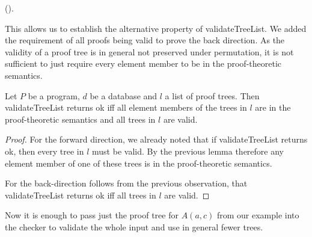(\allTreeElementsOfValidTreeInSemantics).

This allows us to establish the alternative property of validateTreeList. We added the requirement of all proofs being valid to prove the back direction. As the validity of a proof tree is in general not preserved under permutation, it is not sufficient to just require every element member to be in the proof-theoretic semantics.

\begin{lemma}[\validateTreeListUnitIffSubsetSemanticsAndAllValid]
    Let $P$ be a program, $d$ be a database and $l$ a list of proof trees. Then validateTreeList returns ok iff all element members of the trees in $l$ are in the proof-theoretic semantics and all trees in $l$ are valid.
\end{lemma}
\begin{proof}
    For the forward direction, we already noted that if validateTreeList returns ok, then every tree in $l$ must be valid. By the previous lemma therefore any element member of one of these trees is in the proof-theoretic semantics.

    For the back-direction follows from the previous observation, that validateTreeList returns ok iff all trees in $l$ are valid.
\end{proof}

Now it is enough to pass just the proof tree for $A(a,c)$ from our example into the checker to validate the whole input and use in general fewer trees. 
